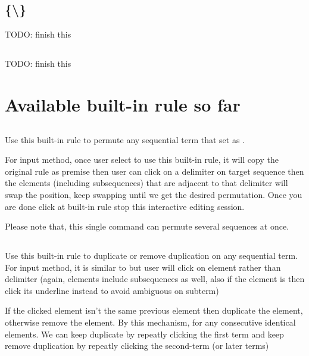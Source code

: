 \subsection{\kRule {} \{\kInference \textbackslash \kCompound \} }
TODO: finish this

\subsection{\kTheorem {}}
TODO: finish this

\section{Available built-in rule so far}

\subsection{}
Use this built-in rule to permute any sequential term that set \kCommutative as \kTrue.

For input method, once user select to use this built-in rule, it will copy the original rule as premise then user can click on a delimiter on target sequence then the elements (including subsequences) that are adjacent to that delimiter will swap the position, keep swapping until we get the desired permutation. Once you are done click at built-in rule stop this interactive editing session.

Please note that, this single command can permute several sequences at once.

\subsection{}
Use this built-in rule to duplicate or remove duplication on any sequential term. For input method, it is similar to  but user will click on element rather than delimiter (again, elements include subsequences as well, also if the element is  then click its underline instead to avoid ambiguous on subterm)

If the clicked element isn't the same previous element then duplicate the element, otherwise remove the element. By this mechanism, for any consecutive identical elements. We can keep duplicate by repeatly clicking the first term and keep remove duplication by repeatly clicking the second-term (or later terms)

